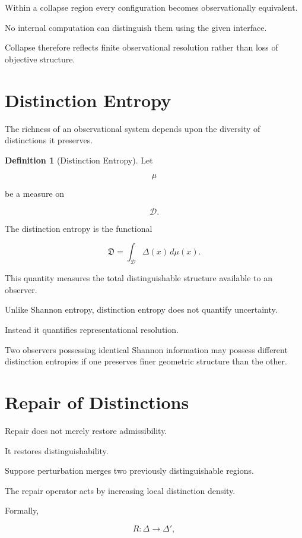 \documentclass[11pt,oneside]{book}
\numberwithin{equation}{chapter}
\theoremstyle{definition}
\newtheorem{definition}{Definition}[chapter]
\theoremstyle{plain}
\begin{document}
Within a collapse region every configuration becomes observationally
equivalent.

No internal computation can distinguish them using the given interface.

Collapse therefore reflects finite observational resolution rather than loss
of objective structure.

\section{Distinction Entropy}

The richness of an observational system depends upon the diversity of
distinctions it preserves.

\begin{definition}[Distinction Entropy]

Let

\[
\mu
\]

be a measure on

\[
\mathcal{D}.
\]

The distinction entropy is the functional

\[
\mathfrak{D}
=
\int_{\mathcal{D}}
\Delta(x)
\,d\mu(x).
\]

\end{definition}

This quantity measures the total distinguishable structure available to an
observer.

Unlike Shannon entropy, distinction entropy does not quantify uncertainty.

Instead it quantifies representational resolution.

Two observers possessing identical Shannon information may possess different
distinction entropies if one preserves finer geometric structure than the
other.

\section{Repair of Distinctions}

Repair does not merely restore admissibility.

It restores distinguishability.

Suppose perturbation merges two previously distinguishable regions.

The repair operator acts by increasing local distinction density.

Formally,

\[
R:
\Delta
\longrightarrow
\Delta',
\]
\end{document}
